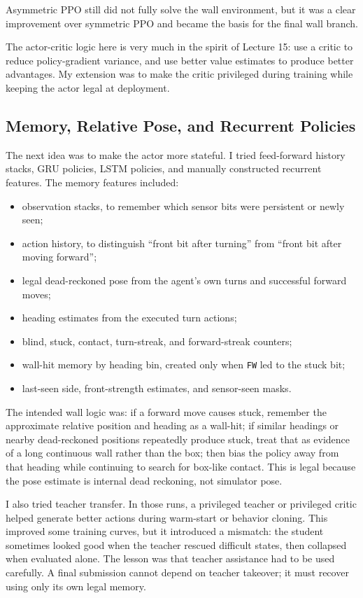 \documentclass[11pt, oneside]{article}   	%
\begin{document}
Asymmetric PPO still did not fully solve the wall environment, but it was a clear
improvement over symmetric PPO and became the basis for the final wall branch.

The actor-critic logic here is very much in the spirit of Lecture 15: use a critic to
reduce policy-gradient variance, and use better value estimates to produce better
advantages. My extension was to make the critic privileged during training while keeping
the actor legal at deployment.

\subsection{Memory, Relative Pose, and Recurrent Policies}

The next idea was to make the actor more stateful. I tried feed-forward history stacks,
GRU policies, LSTM policies, and manually constructed recurrent features. The memory
features included:
\begin{itemize}[leftmargin=1.5em]
  \item observation stacks, to remember which sensor bits were persistent or newly seen;
  \item action history, to distinguish ``front bit after turning'' from ``front bit after
  moving forward'';
  \item legal dead-reckoned pose from the agent's own turns and successful forward moves;
  \item heading estimates from the executed turn actions;
  \item blind, stuck, contact, turn-streak, and forward-streak counters;
  \item wall-hit memory by heading bin, created only when \texttt{FW} led to the stuck
  bit;
  \item last-seen side, front-strength estimates, and sensor-seen masks.
\end{itemize}

The intended wall logic was: if a forward move causes stuck, remember the approximate
relative position and heading as a wall-hit; if similar headings or nearby dead-reckoned
positions repeatedly produce stuck, treat that as evidence of a long continuous wall
rather than the box; then bias the policy away from that heading while continuing to
search for box-like contact. This is legal because the pose estimate is internal dead
reckoning, not simulator pose.

I also tried teacher transfer. In those runs, a privileged teacher or privileged critic
helped generate better actions during warm-start or behavior cloning. This improved
some training curves, but it introduced a mismatch: the student sometimes looked good
when the teacher rescued difficult states, then collapsed when evaluated alone. The
lesson was that teacher assistance had to be used carefully. A final submission cannot
depend on teacher takeover; it must recover using only its own legal memory.
\end{document}
